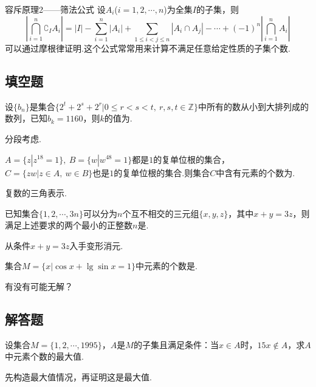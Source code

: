 \documentclass[cn,hazy,black,10pt,normal]{elegantnote}
\newcommand{\tk}{\uline{\hspace{4em}}}
\begin{document}
\begin{theorem}{容斥原理2——筛法公式}
	设$A_i$($i=1,2, \cdots ,n$)为全集$I$的子集，则
	$$|\bigcap_{i=1}^{n} \complement _{I} A_i| = |I| - \sum_{i=1}^{n} |A_i|+\sum_{1 \leq i < j \leq n}|A_i \cap A_j| - \cdots + (-1)^{n} |\bigcap_{i=1}^{n} A_i|$$
	可以通过摩根律证明.这个公式常常用来计算不满足任意给定性质的子集个数.
\end{theorem}

\subsection*{填空题}

\begin{problem} %
	设$\{ b_n \}$是集合$\{ 2^t+2^s+2^r | 0 \leq r < s < t, ~r,s,t \in \mathbb{Z} \}$中所有的数从小到大排列成的数列，已知$b_k = 1160$，则$k$的值为\tk .
\end{problem}
\begin{hint}
	分段考虑.
\end{hint}

\begin{problem} %
	$A=\{ z|z^{18}=1 \},~ B=\{ w|w^{48}=1 \}$都是$1$的复单位根的集合，$C=\{ zw|z \in A,~ w \in B \}$也是$1$的复单位根的集合.则集合$C$中含有元素的个数为\tk .
\end{problem}
\begin{hint}
	复数的三角表示.
\end{hint}

\begin{problem} %
	已知集合$\{ 1,2, \cdots ,3n \}$可以分为$n$个互不相交的三元组$\{ x,y,z \}$，其中$x+y=3z$，则满足上述要求的两个最小的正整数$n$是\tk .
\end{problem}
\begin{hint}
	从条件$x+y=3z$入手变形消元.
\end{hint}

\begin{problem} %
	集合$M= \{ x|\cos{x} + \lg \sin{x} = 1 \}$中元素的个数是\tk .
\end{problem}
\begin{hint}
	有没有可能无解？
\end{hint}

\subsection*{解答题}

\begin{problem} %
	设集合$M = \{ 1,2, \cdots ,1995 \}$，$A$是$M$的子集且满足条件：当$x \in A$时，$15x \notin A$，求$A$中元素个数的最大值.
\end{problem}
\begin{hint}
	先构造最大值情况，再证明这是最大值.
\end{hint}
\end{document}

